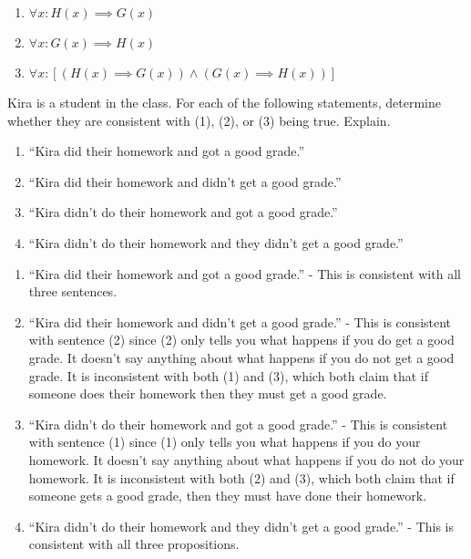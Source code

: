 \begin{enumerate}
		\item $\forall x: H(x) \implies G(x)$
		\item $\forall x: G(x) \implies H(x)$
		\item $\forall x: [(H(x) \implies G(x)) \wedge (G(x) \implies H(x))]$
	\end{enumerate}

\begin{xca}
		Kira is a student in the class.  For each of the following statements, determine whether they are consistent with (1), (2), or (3) being true.  Explain.
		
		\begin{enumerate}
			\renewcommand{\theenumi}{\alph{enumi}}
			\item ``Kira did their homework and got a good grade.''
			\item ``Kira did their homework and didn't get a good grade.''
			\item ``Kira didn't do their homework and got a good grade.''
			\item ``Kira didn't do their homework and they didn't get a good grade.''
			\end{enumerate}
	\end{xca}

\begin{solutions}
			\begin{enumerate}
		\renewcommand{\theenumi}{\alph{enumi}}
		\item ``Kira did their homework and got a good grade.'' - This is consistent with all three sentences.
		\item ``Kira did their homework and didn't get a good grade.'' - This is consistent with sentence (2) since (2) only tells you what happens if you do get a good grade.  It doesn't say anything about what happens if you do not get a good grade.  It is inconsistent with both (1) and (3), which both claim that if someone does their homework then they must get a good grade.
		\item ``Kira didn't do their homework and got a good grade.'' - This is consistent with sentence (1) since (1) only tells you what happens if you do your homework.  It doesn't say anything about what happens if you do not do your homework. It is inconsistent with both (2) and (3), which both claim that if someone gets a good grade, then they must have done their homework.
		\item ``Kira didn't do their homework and they didn't get a good grade.''  - This is consistent with all three propositions.
	\end{enumerate}
	\end{solutions}


